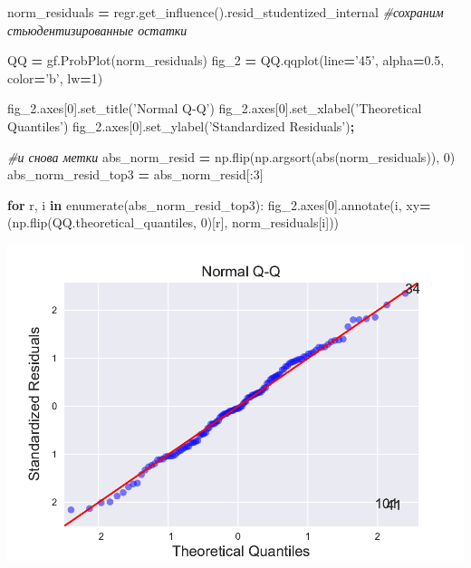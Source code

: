 \documentclass[]{book}
\newenvironment{Shaded}{\begin{snugshade}}{\end{snugshade}}
\newcommand{\BuiltInTok}[1]{#1}
\newcommand{\CommentTok}[1]{\textcolor[rgb]{0.56,0.35,0.01}{\textit{#1}}}
\newcommand{\ControlFlowTok}[1]{\textcolor[rgb]{0.13,0.29,0.53}{\textbf{#1}}}
\newcommand{\DecValTok}[1]{\textcolor[rgb]{0.00,0.00,0.81}{#1}}
\newcommand{\FloatTok}[1]{\textcolor[rgb]{0.00,0.00,0.81}{#1}}
\newcommand{\KeywordTok}[1]{\textcolor[rgb]{0.13,0.29,0.53}{\textbf{#1}}}
\newcommand{\NormalTok}[1]{#1}
\newcommand{\OperatorTok}[1]{\textcolor[rgb]{0.81,0.36,0.00}{\textbf{#1}}}
\newcommand{\StringTok}[1]{\textcolor[rgb]{0.31,0.60,0.02}{#1}}
\begin{document}
\begin{Shaded}
\begin{Highlighting}[]
\NormalTok{norm_residuals }\OperatorTok{=}\NormalTok{ regr.get_influence().resid_studentized_internal }\CommentTok{#сохраним стьюдентизированные остатки }


\NormalTok{QQ }\OperatorTok{=}\NormalTok{ gf.ProbPlot(norm_residuals)}
\NormalTok{fig_2 }\OperatorTok{=}\NormalTok{ QQ.qqplot(line}\OperatorTok{=}\StringTok{'45'}\NormalTok{, alpha}\OperatorTok{=}\FloatTok{0.5}\NormalTok{, color}\OperatorTok{=}\StringTok{'b'}\NormalTok{, lw}\OperatorTok{=}\DecValTok{1}\NormalTok{)}


\NormalTok{fig_2.axes[}\DecValTok{0}\NormalTok{].set_title(}\StringTok{'Normal Q-Q'}\NormalTok{)}
\NormalTok{fig_2.axes[}\DecValTok{0}\NormalTok{].set_xlabel(}\StringTok{'Theoretical Quantiles'}\NormalTok{)}
\NormalTok{fig_2.axes[}\DecValTok{0}\NormalTok{].set_ylabel(}\StringTok{'Standardized Residuals'}\NormalTok{)}\OperatorTok{;}

\CommentTok{#и снова метки}
\NormalTok{abs_norm_resid }\OperatorTok{=}\NormalTok{ np.flip(np.argsort(}\BuiltInTok{abs}\NormalTok{(norm_residuals)), }\DecValTok{0}\NormalTok{)}
\NormalTok{abs_norm_resid_top3 }\OperatorTok{=}\NormalTok{ abs_norm_resid[:}\DecValTok{3}\NormalTok{]}

\ControlFlowTok{for}\NormalTok{ r, i }\KeywordTok{in} \BuiltInTok{enumerate}\NormalTok{(abs_norm_resid_top3):}
\NormalTok{    fig_2.axes[}\DecValTok{0}\NormalTok{].annotate(i, }
\NormalTok{                               xy}\OperatorTok{=}\NormalTok{(np.flip(QQ.theoretical_quantiles, }\DecValTok{0}\NormalTok{)[r],}
\NormalTok{                                   norm_residuals[i]))}
\end{Highlighting}
\end{Shaded}

\includegraphics{02-simplereg_files/figure-latex/unnamed-chunk-19-1.pdf}
\end{document}
